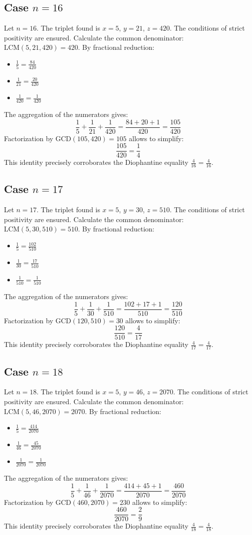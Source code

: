 \documentclass[11pt,a4paper]{article}
\begin{document}
\subsection{Case $n = 16$}
Let $n = 16$. The triplet found is $x = 5$, $y = 21$, $z = 420$.
The conditions of strict positivity are ensured.
Calculate the common denominator: $\text{LCM}(5, 21, 420) = 420$.
By fractional reduction:
\begin{itemize}
    \item $\frac{1}{5} = \frac{84}{420}$
    \item $\frac{1}{21} = \frac{20}{420}$
    \item $\frac{1}{420} = \frac{1}{420}$
\end{itemize}
The aggregation of the numerators gives:
$$ \frac{1}{5} + \frac{1}{21} + \frac{1}{420} = \frac{84 + 20 + 1}{420} = \frac{105}{420} $$
Factorization by $\text{GCD}(105, 420) = 105$ allows to simplify:
$$ \frac{105}{420} = \frac{1}{4} $$
This identity precisely corroborates the Diophantine equality $\frac{4}{16} = \frac{4}{16}$.

\subsection{Case $n = 17$}
Let $n = 17$. The triplet found is $x = 5$, $y = 30$, $z = 510$.
The conditions of strict positivity are ensured.
Calculate the common denominator: $\text{LCM}(5, 30, 510) = 510$.
By fractional reduction:
\begin{itemize}
    \item $\frac{1}{5} = \frac{102}{510}$
    \item $\frac{1}{30} = \frac{17}{510}$
    \item $\frac{1}{510} = \frac{1}{510}$
\end{itemize}
The aggregation of the numerators gives:
$$ \frac{1}{5} + \frac{1}{30} + \frac{1}{510} = \frac{102 + 17 + 1}{510} = \frac{120}{510} $$
Factorization by $\text{GCD}(120, 510) = 30$ allows to simplify:
$$ \frac{120}{510} = \frac{4}{17} $$
This identity precisely corroborates the Diophantine equality $\frac{4}{17} = \frac{4}{17}$.

\subsection{Case $n = 18$}
Let $n = 18$. The triplet found is $x = 5$, $y = 46$, $z = 2070$.
The conditions of strict positivity are ensured.
Calculate the common denominator: $\text{LCM}(5, 46, 2070) = 2070$.
By fractional reduction:
\begin{itemize}
    \item $\frac{1}{5} = \frac{414}{2070}$
    \item $\frac{1}{46} = \frac{45}{2070}$
    \item $\frac{1}{2070} = \frac{1}{2070}$
\end{itemize}
The aggregation of the numerators gives:
$$ \frac{1}{5} + \frac{1}{46} + \frac{1}{2070} = \frac{414 + 45 + 1}{2070} = \frac{460}{2070} $$
Factorization by $\text{GCD}(460, 2070) = 230$ allows to simplify:
$$ \frac{460}{2070} = \frac{2}{9} $$
This identity precisely corroborates the Diophantine equality $\frac{4}{18} = \frac{4}{18}$.
\end{document}
